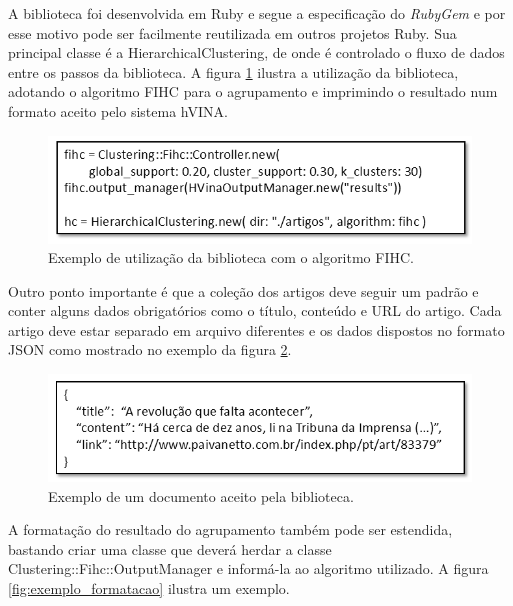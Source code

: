 \documentclass[a4paper,12pt]{article}
\begin{document}
A biblioteca foi desenvolvida em Ruby e segue a especificação do \emph{RubyGem} e por esse motivo pode ser facilmente reutilizada em outros projetos Ruby. Sua principal classe é a HierarchicalClustering, de onde é controlado o fluxo de dados entre os passos da biblioteca. A figura \ref{fig:exemplo_biblioteca} ilustra a utilização da biblioteca, adotando o algoritmo FIHC para o agrupamento e imprimindo o resultado num formato aceito pelo sistema hVINA.

\begin{figure}[H]
    \begin{center}
        \includegraphics[scale=0.6]{exemplo_biblioteca.png}
    \end{center}
    \caption{Exemplo de utilização da biblioteca com o algoritmo FIHC.}
    \label{fig:exemplo_biblioteca}
\end{figure}

Outro ponto importante é que a coleção dos artigos deve seguir um padrão e conter alguns dados obrigatórios como o título, conteúdo e URL do artigo. Cada artigo deve estar separado em arquivo diferentes e os dados dispostos no formato JSON como mostrado no exemplo da figura \ref{fig:exemplo_artigo}.

\begin{figure}[H]
    \begin{center}
        \includegraphics[scale=0.6]{exemplo_artigo.png}
    \end{center}
    \caption{Exemplo de um documento aceito pela biblioteca.}
    \label{fig:exemplo_artigo}
\end{figure}

A formatação do resultado do agrupamento também pode ser estendida, bastando criar uma classe que deverá herdar a classe Clustering::Fihc::OutputManager e informá-la ao algoritmo utilizado. A figura \ref{fig:exemplo_formatacao} ilustra um exemplo.
\end{document}
